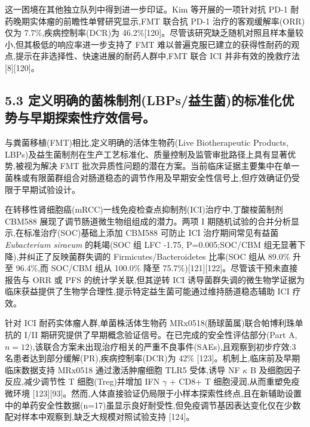 \documentclass[11pt]{article}
\begin{document}
这一困境在其他独立队列中得到进一步印证。Kim 等开展的一项针对抗 PD-1 耐药晚期实体瘤的前瞻性单臂研究显示,FMT 联合抗 PD-1 治疗的客观缓解率(ORR)仅为 7.7\%,疾病控制率(DCR)为 46.2\%{[}120{]}。尽管该研究缺乏随机对照且样本量较小,但其极低的响应率进一步支持了 FMT 难以普遍克服已建立的获得性耐药的观点,提示在非选择性、快速进展的耐药人群中,FMT 联合 ICI 并非有效的挽救疗法 {[}8{]}{[}120{]}。

\subsection{5.3 定义明确的菌株制剂(LBPs/益生菌)的标准化优势与早期探索性疗效信号。}\label{ux5b9aux4e49ux660eux786eux7684ux83ccux682aux5236ux5242lbpsux76caux751fux83ccux7684ux6807ux51c6ux5316ux4f18ux52bfux4e0eux65e9ux671fux63a2ux7d22ux6027ux7597ux6548ux4fe1ux53f7}

与粪菌移植(FMT)相比,定义明确的活体生物药(Live Biotherapeutic Products, LBPs)及益生菌制剂在生产工艺标准化、质量控制及监管审批路径上具有显著优势,被视为解决 FMT 批次异质性问题的潜在方案。当前临床证据主要集中在单一菌株或有限菌群组合对肠道稳态的调节作用及早期安全性信号上,但疗效确证仍受限于早期试验设计。

在转移性肾细胞癌(mRCC)一线免疫检查点抑制剂(ICI)治疗中,丁酸梭菌制剂 CBM588 展现了调节肠道微生物组组成的潜力。两项 I 期随机试验的合并分析显示,在标准治疗(SOC)基础上添加 CBM588 可防止 ICI 治疗期间常见有益菌 \emph{Eubacterium siraeum} 的耗竭(SOC 组 LFC -1.75, P=0.005;SOC/CBM 组无显著下降),并纠正了反映菌群失调的 Firmicutes/Bacteroidetes 比率(SOC 组从 89.0\% 升至 96.4\%,而 SOC/CBM 组从 100.0\% 降至 75.7\%){[}121{]}{[}122{]}。尽管该干预未直接报告与 ORR 或 PFS 的统计学关联,但其逆转 ICI 诱导菌群失调的微生物学证据为临床获益提供了生物学合理性,提示特定益生菌可能通过维持肠道稳态辅助 ICI 疗效。

针对 ICI 耐药实体瘤人群,单菌株活体生物药 MRx0518(肠球菌属)联合帕博利珠单抗的 I/II 期研究提供了早期概念验证信号。在已完成的安全性评估部分(Part A, \(n=12)\),该联合方案未出现治疗相关的严重不良事件(SAEs),且观察到初步疗效:3 名患者达到部分缓解(PR),疾病控制率(DCR)为 42\% {[}123{]}。机制上,临床前及早期临床数据支持 MRx0518 通过激活肿瘤细胞 TLR5 受体,诱导 NF \(\kappa\) B 及细胞因子反应,减少调节性 T 细胞(Treg)并增加 IFN \(\gamma\) + CD8+ T 细胞浸润,从而重塑免疫微环境 {[}123{]}{[}93{]}。然而,人体直接验证仍局限于小样本探索性终点,且在新辅助设置中的单药安全性数据(n=17)虽显示良好耐受性,但免疫调节基因表达变化仅在少数配对样本中观察到,缺乏大规模对照试验支持 {[}124{]}。
\end{document}
